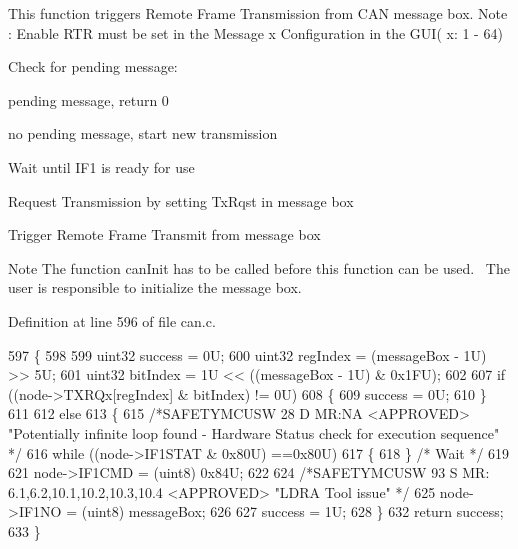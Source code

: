 This function triggers Remote Frame Transmission from C\+AN message box. Note \+: Enable R\+TR must be set in the Message x Configuration in the G\+UI( x\+: 1 -\/ 64) 
\begin{DoxyItemize}
\item Check for pending message\+:
\begin{DoxyItemize}
\item pending message, return 0
\item no pending message, start new transmission
\end{DoxyItemize}
\item Wait until I\+F1 is ready for use ~\newline
~\newline
~\newline

\item Request Transmission by setting Tx\+Rqst in message box ~\newline
~\newline

\item Trigger Remote Frame Transmit from message box ~\newline
 \begin{DoxyNote}{Note}
The function can\+Init has to be called before this function can be used.~\newline
 The user is responsible to initialize the message box.
\end{DoxyNote}

\end{DoxyItemize}

Definition at line 596 of file can.\+c.


\begin{DoxyCode}
597 \{
598 
599     uint32 success  = 0U;
600     uint32 regIndex = (messageBox - 1U) >> 5U;
601     uint32 bitIndex = 1U << ((messageBox - 1U) & 0x1FU);
602 
607     \textcolor{keywordflow}{if} ((node->TXRQx[regIndex] & bitIndex) != 0U)
608     \{
609         success = 0U;
610     \}
611 
612     \textcolor{keywordflow}{else}
613     \{
615         \textcolor{comment}{/*SAFETYMCUSW 28 D MR:NA <APPROVED> "Potentially infinite loop found - Hardware Status check for
       execution sequence" */}
616         \textcolor{keywordflow}{while} ((node->IF1STAT & 0x80U) ==0x80U)
617         \{
618         \} \textcolor{comment}{/* Wait */}
619 
621         node->IF1CMD  = (uint8) 0x84U;
622 
624         \textcolor{comment}{/*SAFETYMCUSW 93 S MR: 6.1,6.2,10.1,10.2,10.3,10.4 <APPROVED> "LDRA Tool issue" */}
625         node->IF1NO = (uint8) messageBox;
626 
627         success = 1U;
628     \}
632     \textcolor{keywordflow}{return} success;
633 \}
\end{DoxyCode}
\mbox{\label{group__CAN_gafb381df2cdfb4e84f43df0226a757002}} 
